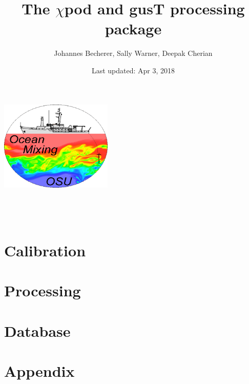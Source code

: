 \documentclass[12pt]{report}
\title{The $\chi$pod and gusT processing package}
\author{Johannes Becherer, Sally Warner, Deepak Cherian}
\date{Last updated: Apr 3, 2018}
\makeatletter
\def\makenewtitle{{
\thispagestyle{plain}
\centering
\includegraphics[width=0.4\textwidth]{figs/omg_logo.png} \\[23ex]
\vspace*{\fill}
{\Huge \@title }\\[4ex]
{\large  \@author}\\[4ex]
\@date\\
\vspace*{\fill}}}
\makeatother
\begin{document}
\pagestyle{fancy}

\makenewtitle
\tableofcontents

\part{Calibration}



\part{Processing}






\part{Database}


\appendix
\part{Appendix}




\end{document}
